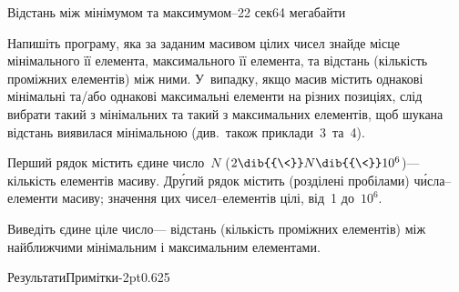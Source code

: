 \begin{problem}{Відстань між мінімумом та максимумом--2}{\stdinOrInputTxt}{\stdoutOrOutputTxt}{2 сек}{64 мегабайти}

Напишіть програму, яка за заданим масивом цілих чисел знайде місце мінімального її елемента, максимального її елемента, та відстань (кількість проміжних елементів) між ними. У~випадку, якщо масив містить однакові мінімальні та\slash{}або однакові максимальні елементи на різних позиціях, слід вибрати такий з мінімальних та такий з максимальних елементів, щоб шукана відстань виявилася мінімальною (див.~також приклади~3~та~4).

\InputFile
Перший рядок містить єдине число~$N$ ($2\dib{{\<}}N\dib{{\<}}10^6$)\nolinebreak[3] --- кількість елементів масиву. Др\'{у}гий рядок містить (розділені пробілами) ч\'{и}сла--елементи масиву; значення цих чисел--елементів цілі, від~1 до~$10^6$.

\OutputFile
Виведіть єдине ціле число\nolinebreak[3] --- відстань (кількість проміжних елементів) між найближчими мінімальним і максимальним елементами.

\Examples


\vspace{-1.125\baselineskip}

\makeTableLongtrue
\noindent\begin{exampleThreeWithSpecNameColTwoAndLineStretch}{7.5em}{5em}{\ifAfour 11cm\else 10cm\fi}{Результати}{Примітки}{\ifAfour -2pt\else -5pt\fi}{-2pt}{0.625}
%
%
%
%
\end{exampleThreeWithSpecNameColTwoAndLineStretch}


\end{problem}
